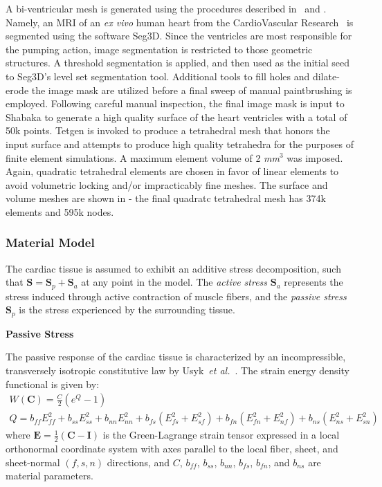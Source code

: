 A bi-ventricular mesh is generated using the procedures described in~ and . Namely, an MRI of an \textit{ex vivo} human heart from the CardioVascular Research~\cite{cvgg} is segmented using the software Seg3D. Since the ventricles are most responsible for the pumping action, image segmentation is restricted to those geometric structures. A threshold segmentation is applied, and then used as the initial seed to Seg3D's level set segmentation tool. Additional tools to fill holes and dilate-erode the image mask are utilized before a final sweep of manual paintbrushing is employed. Following careful manual inspection, the final image mask is input to Shabaka to generate a high quality surface of the heart ventricles with a total of 50k points. Tetgen is invoked to produce a tetrahedral mesh that honors the input surface and attempts to produce high quality tetrahedra for the purposes of finite element simulations. A maximum element volume of 2 \textit{mm$^3$} was imposed. Again, quadratic tetrahedral elements are chosen in favor of linear elements to avoid volumetric locking and/or impracticably fine meshes. The surface and volume meshes are shown in  - the final quadratc tetrahedral mesh has 374k elements and 595k nodes.

\subsubsection{Material Model}
\label{Material Model}

The cardiac tissue is assumed to exhibit an additive stress decomposition, such that $\bm{S} = \bm{S}_p + \bm{S}_a$ at any point in the model. The \textit{active stress} $\bm{S}_a$ represents the stress induced through active contraction of muscle fibers, and the \textit{passive stress} $\bm{S}_p$ is the stress experienced by the surrounding tissue.

\textbf{Passive Stress}

The passive response of the cardiac tissue is characterized by an incompressible, transversely isotropic constitutive law by Usyk~\textit{et al.}~\cite{usyk_2002}. The strain energy density functional is given by:
\begin{gather}
W(\bm{C}) = \frac{C}{2}\left(e^Q -1\right) \\
Q = b_{ff} E^2_{ff} + b_{ss} E^2_{ss} + b_{nn} E^2_{nn} + b_{fs}\left(E^2_{fs} + E^2_{sf}\right) + b_{fn}\left(E^2_{fn} + E^2_{nf}\right) + b_{ns}\left(E^2_{ns} + E^2_{sn}\right)
\label{eqn:usyk}
\end{gather}
where $\bm{E} = \frac{1}{2}(\bm{C} - \bm{I})$ is the Green-Lagrange strain tensor expressed in a local orthonormal coordinate system with axes parallel to the local fiber, sheet, and sheet-normal $(f,s,n)$ directions, and $C$, $b_{ff}$, $b_{ss}$, $b_{nn}$, $b_{fs}$, $b_{fn}$, and $b_{ns}$ are material parameters.

